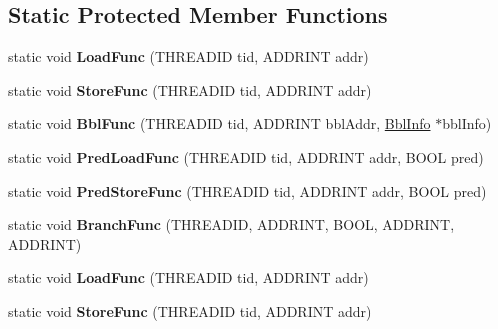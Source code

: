 \subsection*{Static Protected Member Functions}
\begin{DoxyCompactItemize}
\item 
\hypertarget{classSimpleCore_a8cffd62b7ec53e96dd4de5567e792a25}{static void {\bfseries Load\-Func} (T\-H\-R\-E\-A\-D\-I\-D tid, A\-D\-D\-R\-I\-N\-T addr)}\label{classSimpleCore_a8cffd62b7ec53e96dd4de5567e792a25}

\item 
\hypertarget{classSimpleCore_a4fc80cc9f07ac7c512821eb40d97a187}{static void {\bfseries Store\-Func} (T\-H\-R\-E\-A\-D\-I\-D tid, A\-D\-D\-R\-I\-N\-T addr)}\label{classSimpleCore_a4fc80cc9f07ac7c512821eb40d97a187}

\item 
\hypertarget{classSimpleCore_a3649ae716c7750b0c2b59faed5328cd1}{static void {\bfseries Bbl\-Func} (T\-H\-R\-E\-A\-D\-I\-D tid, A\-D\-D\-R\-I\-N\-T bbl\-Addr, \hyperlink{structBblInfo}{Bbl\-Info} $\ast$bbl\-Info)}\label{classSimpleCore_a3649ae716c7750b0c2b59faed5328cd1}

\item 
\hypertarget{classSimpleCore_af442156a052820f774963e9ea72a6e82}{static void {\bfseries Pred\-Load\-Func} (T\-H\-R\-E\-A\-D\-I\-D tid, A\-D\-D\-R\-I\-N\-T addr, B\-O\-O\-L pred)}\label{classSimpleCore_af442156a052820f774963e9ea72a6e82}

\item 
\hypertarget{classSimpleCore_a2dc9819b5cc0d522b77a45bc84de48fd}{static void {\bfseries Pred\-Store\-Func} (T\-H\-R\-E\-A\-D\-I\-D tid, A\-D\-D\-R\-I\-N\-T addr, B\-O\-O\-L pred)}\label{classSimpleCore_a2dc9819b5cc0d522b77a45bc84de48fd}

\item 
\hypertarget{classSimpleCore_a7a785c0ea70ef0025917906017f2d995}{static void {\bfseries Branch\-Func} (T\-H\-R\-E\-A\-D\-I\-D, A\-D\-D\-R\-I\-N\-T, B\-O\-O\-L, A\-D\-D\-R\-I\-N\-T, A\-D\-D\-R\-I\-N\-T)}\label{classSimpleCore_a7a785c0ea70ef0025917906017f2d995}

\item 
\hypertarget{classSimpleCore_a13776c4654720d2870ebb056f7998fce}{static void {\bfseries Load\-Func} (T\-H\-R\-E\-A\-D\-I\-D tid, A\-D\-D\-R\-I\-N\-T addr)}\label{classSimpleCore_a13776c4654720d2870ebb056f7998fce}

\item 
\hypertarget{classSimpleCore_a5fb54420823edf471813070a372560bc}{static void {\bfseries Store\-Func} (T\-H\-R\-E\-A\-D\-I\-D tid, A\-D\-D\-R\-I\-N\-T addr)}\label{classSimpleCore_a5fb54420823edf471813070a372560bc}


\end{DoxyCompactItemize}
